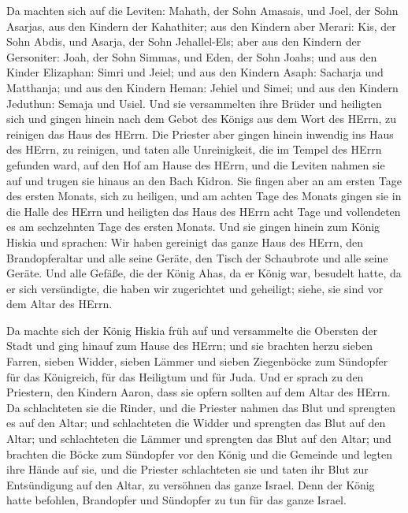  Da machten sich auf die Leviten: Mahath, der Sohn Amasais,
und Joel, der Sohn Asarjas, aus den Kindern der Kahathiter; aus den
Kindern aber Merari: Kis, der Sohn Abdis, und Asarja, der Sohn
Jehallel-Els; aber aus den Kindern der Gersoniter: Joah, der Sohn
Simmas, und Eden, der Sohn Joahs;  und aus den Kinder
Elizaphan: Simri und Jeiel; und aus den Kindern Asaph: Sacharja und
Matthanja;  und aus den Kindern Heman: Jehiel und Simei;
und aus den Kindern Jeduthun: Semaja und Usiel.  Und sie
versammelten ihre Brüder und heiligten sich und gingen hinein nach dem
Gebot des Königs aus dem Wort des HErrn, zu reinigen das Haus des HErrn.
 Die Priester aber gingen hinein inwendig ins Haus des
HErrn, zu reinigen, und taten alle Unreinigkeit, die im Tempel des HErrn
gefunden ward, auf den Hof am Hause des HErrn, und die Leviten nahmen
sie auf und trugen sie hinaus an den Bach Kidron.  Sie
fingen aber an am ersten Tage des ersten Monats, sich zu heiligen, und
am achten Tage des Monats gingen sie in die Halle des HErrn und
heiligten das Haus des HErrn acht Tage und vollendeten es am sechzehnten
Tage des ersten Monats.  Und sie gingen hinein zum König
Hiskia und sprachen: Wir haben gereinigt das ganze Haus des HErrn, den
Brandopferaltar und alle seine Geräte, den Tisch der Schaubrote und alle
seine Geräte.  Und alle Gefäße, die der König Ahas, da er
König war, besudelt hatte, da er sich versündigte, die haben wir
zugerichtet und geheiligt; siehe, sie sind vor dem Altar des HErrn.

 Da machte sich der König Hiskia früh auf und versammelte
die Obersten der Stadt und ging hinauf zum Hause des HErrn;
 und sie brachten herzu sieben Farren, sieben Widder,
sieben Lämmer und sieben Ziegenböcke zum Sündopfer für das Königreich,
für das Heiligtum und für Juda. Und er sprach zu den Priestern, den
Kindern Aaron, dass sie opfern sollten auf dem Altar des HErrn.
 Da schlachteten sie die Rinder, und die Priester nahmen
das Blut und sprengten es auf den Altar; und schlachteten die Widder und
sprengten das Blut auf den Altar; und schlachteten die Lämmer und
sprengten das Blut auf den Altar;  und brachten die Böcke
zum Sündopfer vor den König und die Gemeinde und legten ihre Hände auf
sie,  und die Priester schlachteten sie und taten ihr Blut
zur Entsündigung auf den Altar, zu versöhnen das ganze Israel. Denn der
König hatte befohlen, Brandopfer und Sündopfer zu tun für das ganze
Israel.


